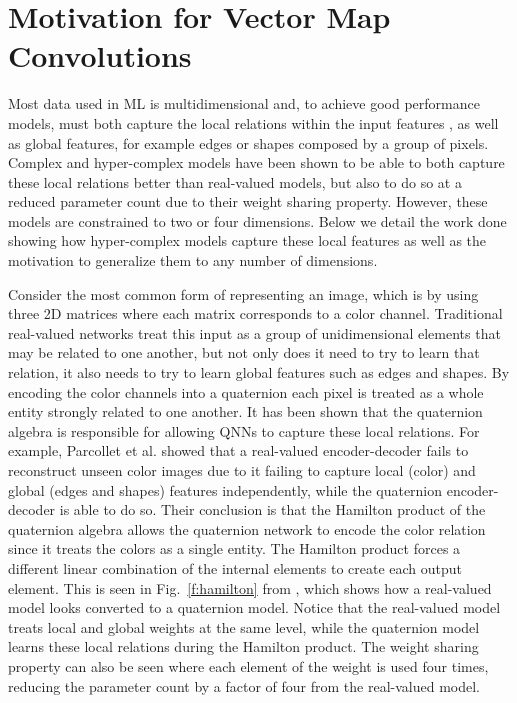 \documentclass[14pt,a4paper]{article}
\begin{document}
\section{Motivation for Vector Map Convolutions}
Most data used in ML is multidimensional and, to achieve good performance models, must both capture the local relations within the input features \cite{tokuda2003trajectory, matsui2004quaternion}, as well as global features, for example edges or shapes composed by a group of pixels.
Complex and hyper-complex models have been shown to be able to both capture these local relations better than real-valued models, but also to do so at a reduced parameter count due to their weight sharing property.
However, these models are constrained to two or four dimensions.
Below we detail the work done showing how hyper-complex models capture these local features as well as the motivation to generalize them to any number of dimensions.

Consider the most common form of representing an image, which is by using three 2D matrices where each matrix corresponds to a color channel.
Traditional real-valued networks treat this input as a group of unidimensional elements that may be related to one another, but not only does it need to try to learn that relation, it also needs to try to learn global features such as edges and shapes.
By encoding the color channels into a quaternion each pixel is treated as a whole entity strongly related to one another.
It has been shown that the quaternion algebra is responsible for allowing QNNs to capture these local relations. 
For example, Parcollet et al. \cite{parcollet2019quaternion} showed that a real-valued encoder-decoder fails to reconstruct unseen color images due to it failing to capture local (color) and global (edges and shapes) features independently, while the quaternion encoder-decoder is able to do so.
Their conclusion is that the Hamilton product of the quaternion algebra allows the quaternion network to encode the color relation since it treats the colors as a single entity.
The Hamilton product forces a different linear combination of the internal elements to create each output element.
This is seen in Fig.~\ref{f:hamilton} from \cite{parcollet2018quaternion-A}, which shows how a real-valued model looks converted to a quaternion model.
Notice that the real-valued model treats local and global weights at the same level, while the quaternion model learns these local relations during the Hamilton product.
The weight sharing property can also be seen where each element of the weight is used four times, reducing the parameter count by a factor of four from the real-valued model.
\end{document}
